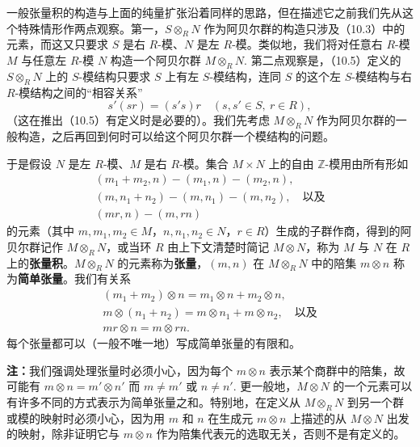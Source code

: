 一般张量积的构造与上面的纯量扩张沿着同样的思路，但在描述它之前我们先从这个特殊情形作两点观察。第一，\(S \otimes_R N\) 作为阿贝尔群的构造只涉及（10.3）中的元素，而这又只要求 \(S\) 是右 \(R\)-模、\(N\) 是左 \(R\)-模。类似地，我们将对任意右 \(R\)-模 \(M\) 与任意左 \(R\)-模 \(N\) 构造一个阿贝尔群 \(M \otimes_R N\). 第二点观察是，（10.5）定义的 \(S \otimes_R N\) 上的 \(S\)-模结构只要求 \(S\) 上有左 \(S\)-模结构，连同 \(S\) 的这个左 \(S\)-模结构与右 \(R\)-模结构之间的“相容关系”
\[
s'(sr) = (s's)r \quad (s, s' \in S,\ r \in R),
\]
（这在推出（10.5）有定义时是必要的）。我们先考虑 \(M \otimes_R N\) 作为阿贝尔群的一般构造，之后再回到何时可以给这个阿贝尔群一个模结构的问题。

于是假设 \(N\) 是左 \(R\)-模、\(M\) 是右 \(R\)-模。集合 \(M \times N\) 上的自由 \(\mathbb{Z}\)-模用由所有形如
\begin{equation}
\begin{gathered}
(m_1+m_2, n)-(m_1, n)-(m_2, n), \\
(m, n_1+n_2)-(m, n_1)-(m, n_2), \quad \text{以及} \\
(mr, n)-(m, rn)
\end{gathered}\tag{10.6}
\end{equation}
的元素（其中 \(m, m_1, m_2 \in M\)，\(n, n_1, n_2 \in N\)，\(r \in R\)）生成的子群作商，得到的阿贝尔群记作 \(M \otimes_R N\)，或当环 \(R\) 由上下文清楚时简记 \(M \otimes N\)，称为 \(M\) 与 \(N\) 在 \(R\) 上的\textbf{张量积}。\(M \otimes_R N\) 的元素称为\textbf{张量}，\((m, n)\) 在 \(M \otimes_R N\) 中的陪集 \(m \otimes n\) 称为\textbf{简单张量}。我们有关系
\begin{equation}
\begin{gathered}
(m_1+m_2) \otimes n = m_1 \otimes n + m_2 \otimes n, \\
m \otimes (n_1+n_2) = m \otimes n_1 + m \otimes n_2, \quad \text{以及} \\
mr \otimes n = m \otimes rn.
\end{gathered}\tag{10.7}
\end{equation}
每个张量都可以（一般不唯一地）写成简单张量的有限和。

\noindent\textbf{注：}我们强调处理张量时必须小心，因为每个 \(m \otimes n\) 表示某个商群中的陪集，故可能有 \(m \otimes n = m' \otimes n'\) 而 \(m \neq m'\) 或 \(n \neq n'\). 更一般地，\(M \otimes N\) 的一个元素可以有许多不同的方式表示为简单张量之和。特别地，在定义从 \(M \otimes_R N\) 到另一个群或模的映射时必须小心，因为用 \(m\) 和 \(n\) 在生成元 \(m \otimes n\) 上描述的从 \(M \otimes N\) 出发的映射，除非证明它与 \(m \otimes n\) 作为陪集代表元的选取无关，否则不是有定义的。

